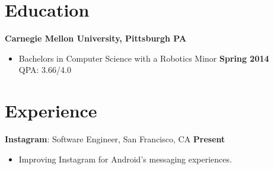 \documentclass[sectioned]{dsyangres}
\begin{document}


\address{
 \hfill 1511 Jeffersion St Unit 219 \\
  \hfill Oakland, CA 94612
   }


\begin{resume}


\section{Education}

\textbf{Carnegie Mellon University, Pittsburgh PA}
  \begin{itemize}
    \item Bachelors in Computer Science with a Robotics Minor \hfill \textbf{ Spring 2014}
      \\ QPA: 3.66/4.0
  \end{itemize}



\section{Experience}
\textbf{Instagram}: Software Engineer, San Francisco, CA \hfill \textbf{Present}
  \begin{itemize}
      \item Improving Instagram for Android's messaging experiences. 
  \end{itemize}


\end{resume}
\end{document}
